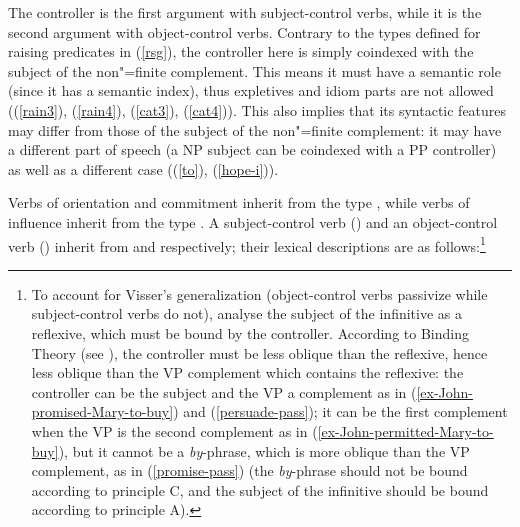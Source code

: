 \documentclass[output=paper
	        ,collection
	        ,collectionchapter
 	        ,biblatex
                ,babelshorthands
                ,newtxmath
                ,draftmode
                ,colorlinks, citecolor=brown
]{langscibook}
\begin{document}
The controller is the first argument with subject-control verbs, while it is the second argument
with object-control verbs. Contrary to the types defined for raising predicates in (\ref{rsg}), the
controller here is simply coindexed with the subject of the non"=finite complement. 
This means it
must have a semantic role (since it has a semantic index), thus expletives and idiom parts are not
allowed ((\ref{rain3}), (\ref{rain4}), (\ref{cat3}), (\ref{cat4})). This also implies that its
syntactic features may differ from those of the subject of the non"=finite complement: it may have a
different part of speech (a NP subject can be coindexed with a PP controller) as well as a different
case ((\ref{to}), (\ref{hope-i})).

Verbs of orientation and commitment inherit from the type , while verbs of
influence inherit from the type .  A subject-control verb () and an
object-control verb () inherit from  and 
respectively; their lexical descriptions are as follows:\footnote{To account for Visser's
  generalization (object-control verbs passivize while subject-control verbs do not),
  \citet{SagandPollard1991} analyse the subject of the infinitive as a reflexive, which must be
  bound by the controller. According to Binding Theory (see ), the
  controller must be less oblique than the reflexive, hence less oblique than the VP complement
  which contains the reflexive: the controller can be the subject and the VP a complement as in
  (\ref{ex-John-promised-Mary-to-buy}) and (\ref{persuade-pass}); it can be the first complement
  when the VP is the second complement as in (\ref{ex-John-permitted-Mary-to-buy}), but it cannot be
  a \emph{by}-phrase, which is more oblique than the VP complement, as in (\ref{promise-pass}) (the
  \emph{by}-phrase should not be bound according to principle C, and the subject of the infinitive
  should be bound according to principle A).}
\end{document}
